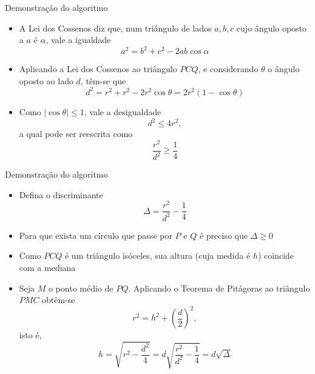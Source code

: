 \begin{frame}[fragile]{Demonstração do algoritmo}

    \begin{itemize}
        \item A Lei dos Cossenos diz que, num triângulo de lados $a, b, c$ cujo ângulo oposto
            a $a$ é $\alpha$, vale a igualdade
            \[
                a^2 = b^2 + c^2 - 2ab\cos \alpha
            \]
        \pause

        \item Aplicando a Lei dos Cossenos ao triângulo $PCQ$, e considerando $\theta$
            o ângulo oposto ao lado $d$, têm-se que
        \[
            d^2 = r^2 + r^2 - 2r^2\cos \theta = 2r^2(1 - \cos \theta)
        \]
        \pause

        \item Como $|\cos\theta| \leq 1$, vale a desigualdade
        \[
            d^2 \leq 4r^2,
        \]
        a qual pode ser reescrita como
        \[
            \frac{r^2}{d^2} \geq \frac{1}{4}
        \]
    \end{itemize}

\end{frame}

\begin{frame}[fragile]{Demonstração do algoritmo}

    \begin{itemize}
        \item Defina o discriminante
        \[
            \Delta = \frac{r^2}{d^2} - \frac{1}{4}
        \]
        \pause

        \item Para que exista um círculo que passe por $P$ e $Q$ é preciso que $\Delta \geq 0$
        \pause
    
        \item Como $PCQ$ é um triângulo isóceles, sua altura (cuja medida é $h$) coincide com a 
            mediana
        \pause

        \item Seja $M$ o ponto médio de $PQ$. Aplicando o Teorema de Pitágoras ao triângulo $PMC$
            obtêm-se
        \[
            r^2 = h^2 + \left(\frac{d}{2}\right)^2, 
        \]
        isto é,
        \[
            h = \sqrt{r^2 - \frac{d^2}{4}} = d\sqrt{\frac{r^2}{d^2} - \frac{1}{4}} = d\sqrt{\Delta}
        \]
    \end{itemize}

\end{frame}

